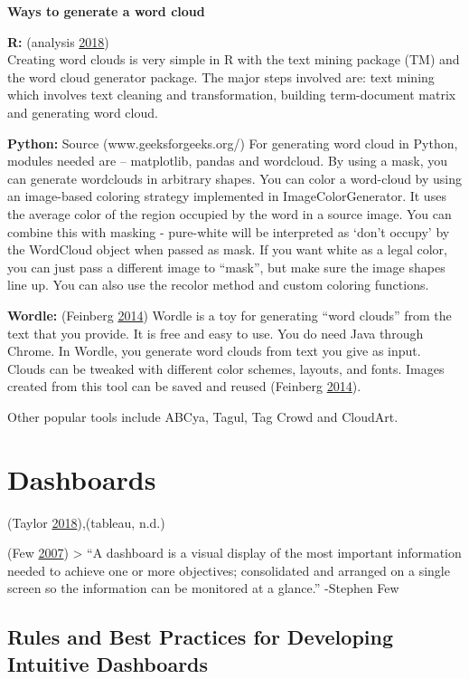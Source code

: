 \documentclass[]{book}
\begin{document}
\textbf{Ways to generate a word cloud}

\textbf{R:} (analysis \protect\hyperlink{ref-r}{2018})\\
Creating word clouds is very simple in R with the text mining package
(TM) and the word cloud generator package. The major steps involved are:
text mining which involves text cleaning and transformation, building
term-document matrix and generating word cloud.

\textbf{Python:} Source (www.geeksforgeeks.org/) For generating word
cloud in Python, modules needed are -- matplotlib, pandas and wordcloud.
By using a mask, you can generate wordclouds in arbitrary shapes. You
can color a word-cloud by using an image-based coloring strategy
implemented in ImageColorGenerator. It uses the average color of the
region occupied by the word in a source image. You can combine this with
masking - pure-white will be interpreted as `don't occupy' by the
WordCloud object when passed as mask. If you want white as a legal
color, you can just pass a different image to ``mask'', but make sure
the image shapes line up. You can also use the recolor method and custom
coloring functions.

\textbf{Wordle:} (Feinberg \protect\hyperlink{ref-wordle}{2014}) Wordle
is a toy for generating ``word clouds'' from the text that you provide.
It is free and easy to use. You do need Java through Chrome. In Wordle,
you generate word clouds from text you give as input. Clouds can be
tweaked with different color schemes, layouts, and fonts. Images created
from this tool can be saved and reused (Feinberg
\protect\hyperlink{ref-wordle}{2014}).

Other popular tools include ABCya, Tagul, Tag Crowd and CloudArt.

\section{Dashboards}\label{dashboards}

(Taylor \protect\hyperlink{ref-intuitive_dash}{2018}),(tableau, n.d.)

(Few \protect\hyperlink{ref-dashboard}{2007}) \textgreater{} ``A
dashboard is a visual display of the most important information needed
to achieve one or more objectives; consolidated and arranged on a single
screen so the information can be monitored at a glance.'' -Stephen Few

\subsection{Rules and Best Practices for Developing Intuitive
Dashboards}\label{rules-and-best-practices-for-developing-intuitive-dashboards}
\end{document}
